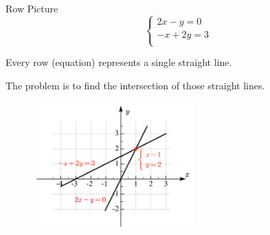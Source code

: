 \documentclass{beamer}
\begin{document}
\begin{frame}{Row Picture}
\vspace{-5pt}
\begin{equation*}
    \begin{cases}
	2x-y=0\\
	-x+2y=3\\
\end{cases}
\end{equation*}

Every row (equation) represents a single straight line.

The problem is to find the intersection of those straight lines.

\begin{figure}
    \centering
    \includegraphics[width=0.55\textwidth]{Row.jpg}
\end{figure}

\end{frame}
\end{document}
